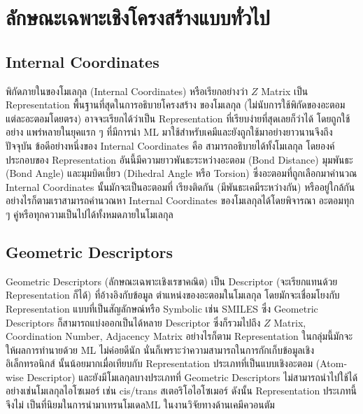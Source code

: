 \section{ลักษณะเฉพาะเชิงโครงสร้างแบบทั่วไป}
\label{sec:struc_feat}

\subsection{Internal Coordinates}
\label{ssec:internal_coord}

พิกัดภายในของโมเลกุล (Internal Coordinates) หรือเรียกอย่างว่า $Z$ Matrix เป็น Representation พื้นฐานที่สุดในการอธิบายโครงสร้าง%
ของโมเลกุล (ไม่นับการใช้พิกัดของอะตอมแต่ละอะตอมโดยตรง) อาจจะเรียกได้ว่าเป็น Representation ที่เรียบง่ายที่สุดเลยก็ว่าได้ โดยถูกใช้อย่าง%
แพร่หลายในยุคแรก ๆ ที่มีการนำ ML มาใช้สำหรับเคมีและยังถูกใช้มาอย่างยาวนานจึงถึงปัจจุบัน ข้อดีอย่างหนึ่งของ Internal Coordinates คือ%
สามารถอธิบายได้ทั้งโมเลกุล โดยองค์ประกอบของ Representation อันนี้มีความยาวพันธะระหว่างอะตอม (Bond Distance) มุมพันธะ (Bond 
Angle) และมุมบิดเบี้ยว (Dihedral Angle หรือ Torsion) ซึ่งอะตอมที่ถูกเลือกมาคำนวณ Internal Coordinates นั้นมักจะเป็นอะตอมที่%
เรียงติดกัน (มีพันธะเคมีระหว่างกัน) หรืออยู่ใกล้กัน อย่างไรก็ตามเราสามารถคำนวณหา Internal Coordinates ของโมเลกุลได้โดยพิจารณา%
อะตอมทุก ๆ คู่หรือทุกความเป็นไปได้ทั้งหมดภายในโมเลกุล

\subsection{Geometric Descriptors}
\label{ssec:geom_descriptor}

Geometric Descriptors (ลักษณะเฉพาะเชิงเรขาคณิต) เป็น Descriptor (จะเรียกแทนด้วย Representation ก็ได้) ที่อ้างอิงกับข้อมูล%
ตำแหน่งของอะตอมในโมเลกุล โดยมักจะเชื่อมโยงกับ Representation แบบที่เป็นสัญลักษณ์หรือ Symbolic เช่น SMILES ซึ่ง Geometric 
Descriptors ก็สามารถแบ่งออกเป็นได้หลาย Descriptor ซึ่งก็รวมไปถึง $Z$ Matrix, Coordination Number, Adjacency Matrix 
อย่างไรก็ตาม Representation ในกลุ่มนี้มักจะให้ผลการทำนายด้วย ML ไม่ค่อยดีนัก นั่นก็เพราะว่าความสามารถในการกักเก็บข้อมูลเชิงอิเล็กทรอนิกส์%
นั้นน้อยมากเมื่อเทียบกับ Representation ประเภทที่เป็นแบบเชิงอะตอม (Atom-wise Descriptor) และยังมีโมเลกุลบางประเภทที่ Geometric 
Descriptors ไม่สามารถนำไปใช้ได้ อย่างเช่นโมเลกุลไอโซเมอร์ เช่น cis/trans สเตอริโอไอโซเมอร์ ดังนั้น Representation ประเภทนี้จึงไม่%
เป็นที่นิยมในการนำมาเทรนโมเดลML ในงานวิจัยทางด้านเคมีควอนตัม\autocite{keith2021,musil2021}

